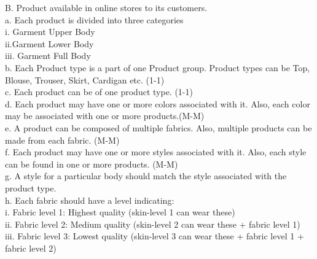 \documentclass[11pt,journal,compsoc]{IEEEtran}
\begin{document}
B.  	Product available in online stores to its customers. \\
a.   	Each product is divided into three categories \\
                              i. Garment Upper Body \\
                              ii.Garment Lower Body \\
           iii.     Garment Full Body \\
b.  	Each Product type is a part of one Product group. Product types can be Top, Blouse, Trouser, Skirt, Cardigan etc. (1-1) \\
c.   	Each product can be of one product type. (1-1) \\
d.  	Each product may have one or more colors associated with it. Also, each color may be associated with one or more products.(M-M) \\
e.   	A product can be composed of multiple fabrics. Also, multiple products can be made from each fabric. (M-M) \\
f.        Each product may have one or more styles associated with it. Also, each style can be found in one or more products. (M-M) \\
g.   	A style for a particular body should match the style associated with the product type. \\
h.  	Each fabric should have a level indicating: \\
i.      Fabric level 1: Highest quality (skin-level 1 can wear these) \\
ii.      Fabric level 2: Medium quality (skin-level 2 can wear these + fabric level 1) \\
iii.      Fabric level 3: Lowest quality (skin-level 3 can wear these + fabric level 1 + fabric level 2) \\



\end{document}
